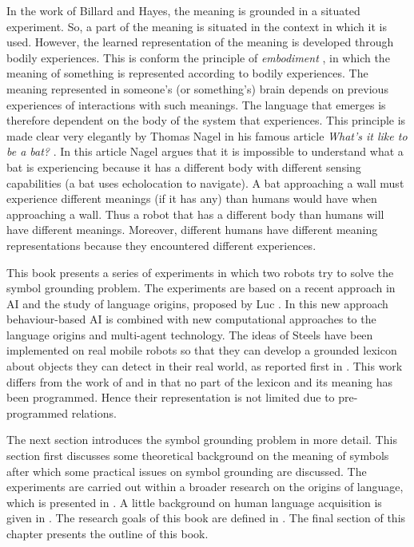 In the work of Billard and Hayes, the meaning is grounded in a situated experiment. So, a part of the meaning is situated in the context in which it is used. However, the learned representation of the meaning is developed through bodily experiences. This is conform the principle of {\em embodiment} \citep{lakoff:1987}, in which the meaning of something is represented according to bodily experiences. The meaning represented in someone's (or something's) brain depends on previous experiences of interactions with such meanings. The language that emerges is therefore dependent on the body of the system that experiences. This principle is made clear very elegantly by Thomas Nagel in his famous article {\em What's it like to be a bat?} \citep{nagel:1974}. In this article Nagel argues that it is impossible to understand what a bat is experiencing because it has a different body with different sensing capabilities (a bat uses echolocation to navigate). A bat approaching a wall must experience different meanings (if it has any) than humans would have when approaching a wall. Thus a robot that has a different body than humans will have different meanings. Moreover, different humans have different meaning representations because they encountered different experiences.

This book presents a series of experiments in which two robots try to solve the symbol grounding problem. The experiments are based on a recent approach in AI and the study of language origins, proposed by Luc \citet{steels:1996a}. In this new approach behaviour-based AI \citep{steelsbrooks:1993} is combined with new computational approaches to the language origins and multi-agent technology. The ideas of Steels have been implemented on real mobile robots so that they can develop a grounded lexicon about objects they can detect in their real world, as reported first in \citealt{steelsvogt:1997}. This work differs from the work of \citet{yancostein} and \citet{billard:1997a} in that no part of the lexicon and its meaning has been programmed. Hence their representation is not limited due to pre-programmed relations.

The next section introduces the symbol grounding problem in more detail. This section first discusses some theoretical background on the meaning of symbols after which some practical issues on symbol grounding are discussed. The experiments are carried out within a broader research on the origins of language, which is presented in . A little background on human language acquisition is given in . The research goals of this book are defined in . The final section of this chapter presents the outline of this book.

